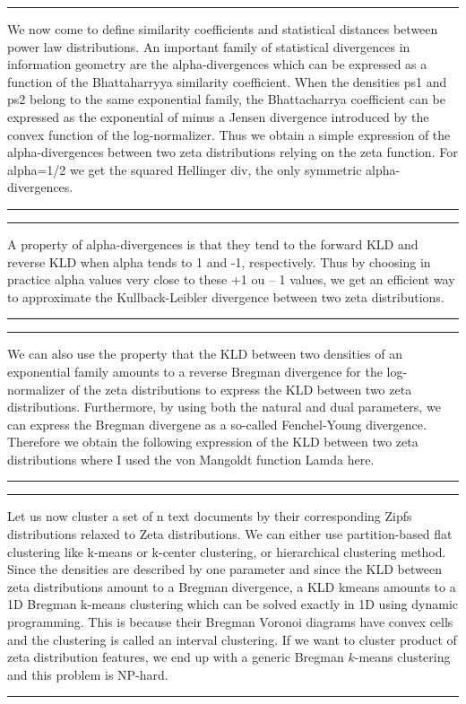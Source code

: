 \documentclass{article}
\def\slide#1{
\noindent\hrule
\begin{center}
\begin{minipage}{0.8\textwidth}
#1
\end{minipage}
\end{center}
\noindent\hrule
}
\begin{document}
\slide{
We now come to define similarity coefficients and statistical distances between power law distributions.
An important family of statistical divergences in information geometry are the alpha-divergences which can be expressed as a function of the Bhattaharryya similarity coefficient.
When the densities ps1 and ps2 belong to the same exponential family, the Bhattacharrya coefficient can be expressed as the exponential of minus a Jensen divergence introduced by the convex function of the log-normalizer.
Thus we obtain a simple expression of the alpha-divergences between two zeta distributions relying on the zeta function. For alpha=1/2 we get the squared Hellinger div, the only symmetric alpha-divergences.
}







\slide{A property of alpha-divergences is that they tend to the forward KLD and reverse KLD when alpha tends to 1 and -1, respectively.
Thus by choosing in practice alpha values very close to these +1 ou – 1 values, we get an efficient way to approximate the Kullback-Leibler divergence between two zeta distributions.
}













\slide{
We can also use the property that the KLD between two densities of an exponential family amounts to a reverse Bregman divergence for the log-normalizer of the zeta distributions to express the KLD between two zeta distributions.
Furthermore, by using both the natural and dual parameters, we can express the Bregman divergene as a so-called Fenchel-Young divergence.
Therefore we obtain the following expression of the KLD between two zeta distributions where I used the von Mangoldt function Lamda here.
}



\slide{
Let us now cluster  a set of n text documents by their corresponding Zipfs distributions relaxed to Zeta distributions. We can either use partition-based flat clustering like k-means or k-center clustering, or hierarchical clustering method.
Since the densities are  described by one parameter and since the KLD between zeta distributions amount to a Bregman divergence, a KLD kmeans amounts to a 1D Bregman k-means clustering which can be solved exactly in 1D using dynamic programming. This is because their Bregman Voronoi diagrams have convex cells and the clustering is called an interval clustering.
If we want to cluster product of zeta distribution features, we end up with a generic Bregman $k$-means clustering and this problem is NP-hard.
}
\end{document}

